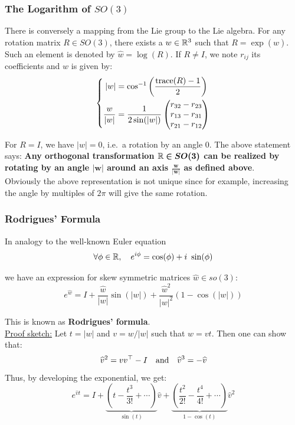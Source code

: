 \subsubsection{The Logarithm of $SO(3)$}%
\label{ssub:the_logarithm_of_so_3_}

There is conversely a mapping from the Lie group to the Lie algebra.
For any rotation matrix $R \in SO(3)$, there exists a $w \in \mathbb{R}^3$
such that $R = \exp(\widehat{w})$. Such an element is denoted by
$\widehat{w} = \log(R)$. If $R \ne I$, we note $r_{ij}$ its coefficients
and $w$ is given by:
	\[\left\{ \begin{aligned}
		|w| &= \cos^{-1}\left(\frac{\text{trace}(R)-1}{2}\right)\\
		\frac{w}{|w|} &= \frac{1}{2\sin(|w|)}
			\begin{pmatrix}
				r_{32} - r_{23} \\
				r_{13} - r_{31} \\
				r_{21} - r_{12} \\
			\end{pmatrix}
	\end{aligned}\right.\]

For $R = I$, we have $|w| = 0$, i.e.\ a rotation by an angle 0.
The above statement says:
\textbf{Any orthogonal transformation $\bm{\mathbb{R} \in SO(3)}$ can be realized
by rotating by an angle $\bm{|w|}$ around an axis
$\bm{\frac{w}{|w|}}$ as defined above}.\\

Obviously the above representation is not unique since for example,
increasing the angle by multiples of $2\pi$ will give the same rotation.


\subsubsection{Rodrigues' Formula}%
\label{ssub:rodrigues_formula}

In analogy to the well-known Euler equation
	\[\forall \phi \in \mathbb{R}, \quad  e^{i\phi} = \cos(\phi) + i\ \sin(\phi)\]

we have an expression for skew symmetric matrices $\widehat{w} \in so(3)$:
	\[\boxed{
	e^{\widehat{w}} = I + \frac{\widehat{w}}{|w|} \sin(|w|)
		+ \frac{\widehat{w}^2}{|w|^2} (1 - \cos(|w|))}\]

This is known as \textbf{Rodrigues' formula}.\\

\underline{Proof sketch:}
Let $t = |w|$ and $v = w/|w|$ such that $w = vt$. Then one can show that:
	\[\widehat{v}^2 = vv^{\top} - I \quad
	\text{and}\quad \widehat{v}^3 = -\widehat{v}\]
Thus, by developing the exponential, we get:
	\[e^{\widehat{v}t} = I +
		\underbrace{\left( t - \frac{t^3}{3!} + \cdots \right)}_{\sin(t)}\widehat{v}
	+ \underbrace{\left(\frac{t^2}{2!}-\frac{t^4}{4!}+\cdots \right)}_{1-\cos(t)}
		\widehat{v}^2\]


